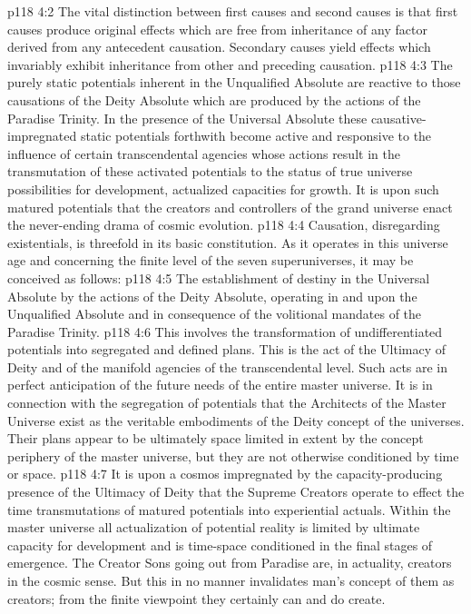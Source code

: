 \vs p118 4:2 The vital distinction between first causes and second causes is that first causes produce original effects which are free from inheritance of any factor derived from any antecedent causation. Secondary causes yield effects which invariably exhibit inheritance from other and preceding causation.
\vs p118 4:3 \pc The purely static potentials inherent in the Unqualified Absolute are reactive to those causations of the Deity Absolute which are produced by the actions of the Paradise Trinity. In the presence of the Universal Absolute these causative\hyp{}impregnated static potentials forthwith become active and responsive to the influence of certain transcendental agencies whose actions result in the transmutation of these activated potentials to the status of true universe possibilities for development, actualized capacities for growth. It is upon such matured potentials that the creators and controllers of the grand universe enact the never\hyp{}ending drama of cosmic evolution.
\vs p118 4:4 Causation, disregarding existentials, is threefold in its basic constitution. As it operates in this universe age and concerning the finite level of the seven superuniverses, it may be conceived as follows:
\vs p118 4:5 \bibnobreakspace {} The establishment of destiny in the Universal Absolute by the actions of the Deity Absolute, operating in and upon the Unqualified Absolute and in consequence of the volitional mandates of the Paradise Trinity.
\vs p118 4:6 \pc {}\bibnobreakspace {} This involves the transformation of undifferentiated potentials into segregated and defined plans. This is the act of the Ultimacy of Deity and of the manifold agencies of the transcendental level. Such acts are in perfect anticipation of the future needs of the entire master universe. It is in connection with the segregation of potentials that the Architects of the Master Universe exist as the veritable embodiments of the Deity concept of the universes. Their plans appear to be ultimately space limited in extent by the concept periphery of the master universe, but  they are not otherwise conditioned by time or space.
\vs p118 4:7 \pc {}\bibnobreakspace {} It is upon a cosmos impregnated by the capacity\hyp{}producing presence of the Ultimacy of Deity that the Supreme Creators operate to effect the time transmutations of matured potentials into experiential actuals. Within the master universe all actualization of potential reality is limited by ultimate capacity for development and is time\hyp{}space conditioned in the final stages of emergence. The Creator Sons going out from Paradise are, in actuality,  creators in the cosmic sense. But this in no manner invalidates man’s concept of them as creators; from the finite viewpoint they certainly can and do create.
